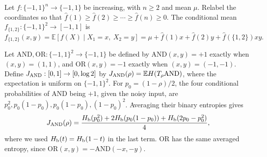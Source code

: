 \documentclass[11pt,letterpaper]{amsart}
\newcommand{\E}{\mathbb E}
\newcommand{\1}{\mathbf 1}
\numberwithin{equation}{section}
\begin{document}
Let $f:\{-1,1\}^n\to\{-1,1\}$ be increasing, with $n\ge2$
and mean $\mu$. Relabel the coordinates so that
$\widehat f(1)\ge\widehat f(2)\ge\cdots\ge\widehat f(n)\ge0$.
The conditional mean
$f_{\{1,2\}}:\{-1,1\}^2\to[-1,1]$ is
\begin{equation}\label{ub:core-mean}
 f_{\{1,2\}}(x,y)
 =\E[f(X)\mid X_1=x,\ X_2=y]=\mu+\widehat f(1)x+\widehat f(2)y
       +\widehat f(\{1,2\})xy.
\end{equation}

Let $\mathrm{AND},\mathrm{OR}:\{-1,1\}^2\to\{-1,1\}$
be defined by $\mathrm{AND}(x,y)=+1$ exactly when $(x,y)=(1,1)$,
and $\mathrm{OR}(x,y)=-1$ exactly when $(x,y)=(-1,-1)$.
Define $J_{\rm AND}:[0,1]\to[0,\log2]$ by
$J_{\rm AND}(\rho)=\E H(T_\rho\mathrm{AND})$,
where the expectation is uniform on $\{-1,1\}^2$.
For $p_0=(1-\rho)/2$, the four conditional probabilities
of AND being $+1$, given the noisy input, are
$p_0^2,p_0(1-p_0),p_0(1-p_0),(1-p_0)^2$.
Averaging their binary entropies gives
\begin{equation}\label{eq:and-entropy}
 J_{\rm AND}(\rho)=
 \frac{H_{\rm b}(p_0^2)+2H_{\rm b}(p_0(1-p_0))
       +H_{\rm b}(2p_0-p_0^2)}4,
\end{equation}
where we used $H_{\rm b}(t)=H_{\rm b}(1-t)$ in the last term.
OR has the same averaged entropy, since
$\mathrm{OR}(x,y)=-\mathrm{AND}(-x,-y)$.
\end{document}
